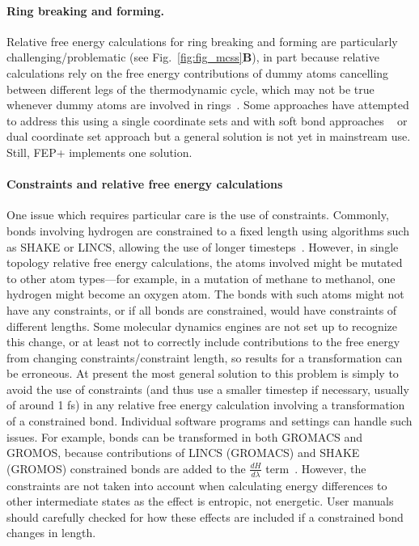 \documentclass[9pt,bestpractices]{livecoms}
\begin{document}
\paragraph{Ring breaking and forming.} \label{subsec: Ring breaking and forming}
Relative free energy calculations for ring breaking and forming are particularly challenging/problematic (see Fig.~\ref{fig:fig_mcss}\textbf{B}), in part because relative calculations rely on the free energy contributions of dummy atoms cancelling between different legs of the thermodynamic cycle, which may not be true whenever dummy atoms are involved in rings~\cite{liu2015ring}.
Some approaches have attempted to address this using a single coordinate sets and with soft bond approaches ~\cite{clark2019relative,wang2017accurate} or dual coordinate set approach \cite{jespers2019qligfep, ries2022relative, bhati2017, bieniek2021} but a general solution is not yet in mainstream use. Still, FEP+ implements one solution\cite{wang2017accurate}.

\paragraph{Constraints and relative free energy calculations}
One issue which requires particular care is the use of constraints.
Commonly, bonds involving hydrogen are constrained to a fixed length using algorithms such as SHAKE or LINCS, allowing the use of longer timesteps~\cite{krautler2001fast}.
However, in single topology relative free energy calculations, the atoms involved might be mutated to other atom types---for example, in a mutation of methane to methanol, one hydrogen might become an oxygen atom. The bonds with such atoms might not have any constraints, or if all bonds are constrained, would have constraints of different lengths. 
Some molecular dynamics engines are not set up to recognize this change, or at least not to correctly include contributions to the free energy from changing constraints/constraint length, so results for a transformation can be erroneous.
At present the most general solution to this problem is simply to avoid the use of constraints (and thus use a smaller timestep if necessary, usually of around 1 fs) in any relative free energy calculation involving a transformation of a constrained bond. Individual software programs and settings can handle such issues. For example, bonds can be transformed in both GROMACS and GROMOS, because contributions of LINCS (GROMACS) and SHAKE (GROMOS) constrained bonds are added to the $\frac{dH}{d\lambda}$ term~\cite{pearlman1993determining, straatsma1992holonomic, pearlman1991overlooked, gunsteren1989computer}. However, the constraints are not taken into account when calculating energy differences to other intermediate states as the effect is entropic, not energetic. User manuals should carefully checked for how these effects are included if a constrained bond changes in length. 
\end{document}
